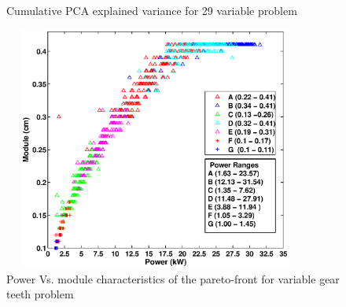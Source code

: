 \begin{figure}[ht]\begin{center}
 \caption{Cumulative PCA explained variance for 29 variable problem}
 \label{gtvClustersEV}
\end{center}\end{figure}



\begin{figure}[ht]\begin{center}
 \includegraphics[width=100mm, height=80mm]{dia/gtvpVsm.eps}
 \caption{Power Vs. module characteristics of the pareto-front for variable gear teeth problem}
 \label{gtvpVsm}
\end{center}\end{figure}
   


